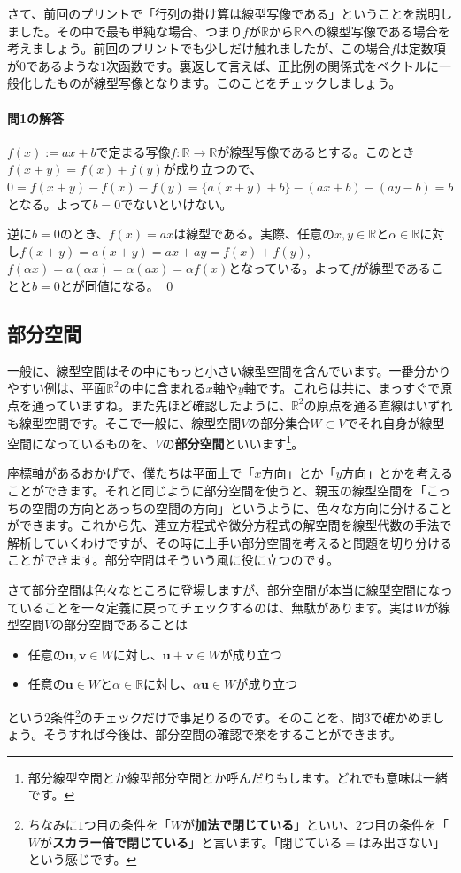 さて、前回のプリントで「行列の掛け算は線型写像である」ということを説明しました。その中で最も単純な場合、つまり$f$が$\mathbb{R}$から$\mathbb{R}$への線型写像である場合を考えましょう。前回のプリントでも少しだけ触れましたが、この場合$f$は定数項が$0$であるような$1$次函数です。裏返して言えば、正比例の関係式をベクトルに一般化したものが線型写像となります。このことをチェックしましょう。

\paragraph{問1の解答}
$f(x) := ax + b$で定まる写像$f\colon\mathbb{R}\rightarrow\mathbb{R}$が線型写像であるとする。このとき$f(x + y) = f(x) + f(y)$が成り立つので、$0 = f(x + y) - f(x) - f(y) = \{a(x + y) + b\} - (ax + b) - (ay - b) = b$となる。よって$b = 0$でないといけない。

逆に$b = 0$のとき、$f(x) = ax$は線型である。実際、任意の$x, y\in\mathbb{R}$と$\alpha\in\mathbb{R}$に対し$f(x + y) = a(x + y) = ax + ay = f(x) + f(y)$, $f(\alpha x) = a (\alpha x) = \alpha (ax) = \alpha f(x)$となっている。よって$f$が線型であることと$b = 0$とが同値になる。 \qed

\subsection{部分空間}

一般に、線型空間はその中にもっと小さい線型空間を含んでいます。一番分かりやすい例は、平面$\mathbb{R}^2$の中に含まれる$x$軸や$y$軸です。これらは共に、まっすぐで原点を通っていますね。また先ほど確認したように、$\mathbb{R}^2$の原点を通る直線はいずれも線型空間です。そこで一般に、線型空間$V$の部分集合$W\subset V$でそれ自身が線型空間になっているものを、$V$の\textbf{部分空間}といいます\footnote{$部分線型空間$とか$線型部分空間$とか呼んだりもします。どれでも意味は一緒です。}。

座標軸があるおかげで、僕たちは平面上で「$x$方向」とか「$y$方向」とかを考えることができます。それと同じように部分空間を使うと、親玉の線型空間を「こっちの空間の方向とあっちの空間の方向」というように、色々な方向に分けることができます。これから先、連立方程式や微分方程式の解空間を線型代数の手法で解析していくわけですが、その時に上手い部分空間を考えると問題を切り分けることができます。部分空間はそういう風に役に立つのです。

さて部分空間は色々なところに登場しますが、部分空間が本当に線型空間になっていることを一々定義に戻ってチェックするのは、無駄があります。実は$W$が線型空間$V$の部分空間であることは
\begin{itemize}
\item 任意の$\bm{u}, \bm{v}\in W$に対し、$\bm{u} + \bm{v} \in W$が成り立つ
\item 任意の$\bm{u}\in W$と$\alpha \in \mathbb{R}$に対し、$\alpha \bm{u}\in W$が成り立つ
\end{itemize}
という$2$条件\footnote{ちなみに$1$つ目の条件を「$W$が\textbf{加法で閉じている}」といい、$2$つ目の条件を「$W$が\textbf{スカラー倍で閉じている}」と言います。「閉じている$=$はみ出さない」という感じです。}のチェックだけで事足りるのです。そのことを、問3で確かめましょう。そうすれば今後は、部分空間の確認で楽をすることができます。

